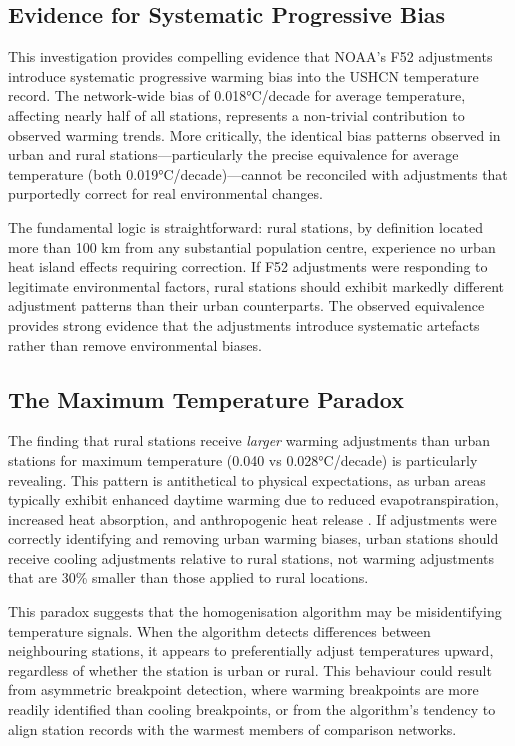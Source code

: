 \documentclass[11pt, a4paper]{article}
\begin{document}
\subsection{Evidence for Systematic Progressive Bias}

This investigation provides compelling evidence that NOAA's F52 adjustments introduce systematic progressive warming bias into the USHCN temperature record. The network-wide bias of 0.018°C/decade for average temperature, affecting nearly half of all stations, represents a non-trivial contribution to observed warming trends. More critically, the identical bias patterns observed in urban and rural stations—particularly the precise equivalence for average temperature (both 0.019°C/decade)—cannot be reconciled with adjustments that purportedly correct for real environmental changes.

The fundamental logic is straightforward: rural stations, by definition located more than 100 km from any substantial population centre, experience no urban heat island effects requiring correction. If F52 adjustments were responding to legitimate environmental factors, rural stations should exhibit markedly different adjustment patterns than their urban counterparts. The observed equivalence provides strong evidence that the adjustments introduce systematic artefacts rather than remove environmental biases.

\subsection{The Maximum Temperature Paradox}

The finding that rural stations receive \textit{larger} warming adjustments than urban stations for maximum temperature (0.040 vs 0.028°C/decade) is particularly revealing. This pattern is antithetical to physical expectations, as urban areas typically exhibit enhanced daytime warming due to reduced evapotranspiration, increased heat absorption, and anthropogenic heat release \parencite{oke1987boundary,arnfield2003urban}. If adjustments were correctly identifying and removing urban warming biases, urban stations should receive cooling adjustments relative to rural stations, not warming adjustments that are 30\% smaller than those applied to rural locations.

This paradox suggests that the homogenisation algorithm may be misidentifying temperature signals. When the algorithm detects differences between neighbouring stations, it appears to preferentially adjust temperatures upward, regardless of whether the station is urban or rural. This behaviour could result from asymmetric breakpoint detection, where warming breakpoints are more readily identified than cooling breakpoints, or from the algorithm's tendency to align station records with the warmest members of comparison networks.
\end{document}
